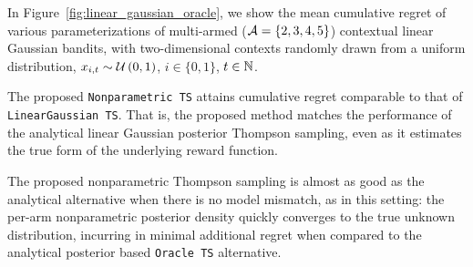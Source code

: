 In Figure~\ref{fig:linear_gaussian_oracle}, we show the mean cumulative regret of various parameterizations of multi-armed ($\mathcal{A}=\{2,3,4,5\}$) contextual linear Gaussian bandits, with two-dimensional contexts randomly drawn from a uniform distribution, \ie $x_{i,t}\sim\mathcal{U}\left( 0,1\right)$, $i\in\{0,1\}$, $t\in {\mathbb N}$.

The proposed \texttt{Nonparametric TS} attains cumulative regret comparable to that of \texttt{LinearGaussian TS}. 
That is, the proposed method matches the performance of the analytical linear Gaussian posterior Thompson sampling, even as it estimates the true form of the underlying reward function.

The proposed nonparametric Thompson sampling is almost as good as the analytical alternative when there is no model mismatch, as in this setting: the per-arm nonparametric posterior density quickly converges to the true unknown distribution, incurring in minimal additional regret when compared to the analytical posterior based \texttt{Oracle TS} alternative.